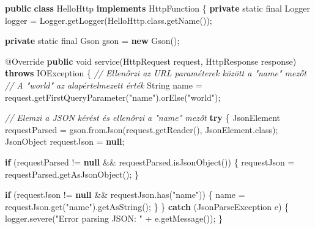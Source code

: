 \documentclass[
]{article}
\newenvironment{Shaded}{}{}
\newcommand{\AttributeTok}[1]{\textcolor[rgb]{0.49,0.56,0.16}{#1}}
\newcommand{\BuiltInTok}[1]{\textcolor[rgb]{0.00,0.50,0.00}{#1}}
\newcommand{\CommentTok}[1]{\textcolor[rgb]{0.38,0.63,0.69}{\textit{#1}}}
\newcommand{\ControlFlowTok}[1]{\textcolor[rgb]{0.00,0.44,0.13}{\textbf{#1}}}
\newcommand{\DataTypeTok}[1]{\textcolor[rgb]{0.56,0.13,0.00}{#1}}
\newcommand{\FunctionTok}[1]{\textcolor[rgb]{0.02,0.16,0.49}{#1}}
\newcommand{\KeywordTok}[1]{\textcolor[rgb]{0.00,0.44,0.13}{\textbf{#1}}}
\newcommand{\NormalTok}[1]{#1}
\newcommand{\OperatorTok}[1]{\textcolor[rgb]{0.40,0.40,0.40}{#1}}
\newcommand{\StringTok}[1]{\textcolor[rgb]{0.25,0.44,0.63}{#1}}
\begin{document}
\begin{Shaded}
\begin{Highlighting}[]
\KeywordTok{public} \KeywordTok{class}\NormalTok{ HelloHttp }\KeywordTok{implements}\NormalTok{ HttpFunction }\OperatorTok{\{}
  \KeywordTok{private} \DataTypeTok{static} \DataTypeTok{final} \BuiltInTok{Logger}\NormalTok{ logger }\OperatorTok{=} \BuiltInTok{Logger}\OperatorTok{.}\FunctionTok{getLogger}\OperatorTok{(}\NormalTok{HelloHttp}\OperatorTok{.}\FunctionTok{class}\OperatorTok{.}\FunctionTok{getName}\OperatorTok{());}

  \KeywordTok{private} \DataTypeTok{static} \DataTypeTok{final}\NormalTok{ Gson gson }\OperatorTok{=} \KeywordTok{new} \FunctionTok{Gson}\OperatorTok{();}

  \AttributeTok{@Override}
  \KeywordTok{public} \DataTypeTok{void} \FunctionTok{service}\OperatorTok{(}\NormalTok{HttpRequest request}\OperatorTok{,}\NormalTok{ HttpResponse response}\OperatorTok{)}
      \KeywordTok{throws} \BuiltInTok{IOException} \OperatorTok{\{}
    \CommentTok{// Ellenőrzi az URL paraméterek között a "name" mezőt}
    \CommentTok{// A "world" az alapértelmezett érték}
    \BuiltInTok{String}\NormalTok{ name }\OperatorTok{=}\NormalTok{ request}\OperatorTok{.}\FunctionTok{getFirstQueryParameter}\OperatorTok{(}\StringTok{"name"}\OperatorTok{).}\FunctionTok{orElse}\OperatorTok{(}\StringTok{"world"}\OperatorTok{);}

    \CommentTok{// Elemzi a JSON kérést és ellenőrzi a "name" mezőt}
    \ControlFlowTok{try} \OperatorTok{\{}
\NormalTok{      JsonElement requestParsed }\OperatorTok{=}\NormalTok{ gson}\OperatorTok{.}\FunctionTok{fromJson}\OperatorTok{(}\NormalTok{request}\OperatorTok{.}\FunctionTok{getReader}\OperatorTok{(),}\NormalTok{ JsonElement}\OperatorTok{.}\FunctionTok{class}\OperatorTok{);}
\NormalTok{      JsonObject requestJson }\OperatorTok{=} \KeywordTok{null}\OperatorTok{;}

      \ControlFlowTok{if} \OperatorTok{(}\NormalTok{requestParsed }\OperatorTok{!=} \KeywordTok{null} \OperatorTok{\&\&}\NormalTok{ requestParsed}\OperatorTok{.}\FunctionTok{isJsonObject}\OperatorTok{())} \OperatorTok{\{}
\NormalTok{        requestJson }\OperatorTok{=}\NormalTok{ requestParsed}\OperatorTok{.}\FunctionTok{getAsJsonObject}\OperatorTok{();}
      \OperatorTok{\}}

      \ControlFlowTok{if} \OperatorTok{(}\NormalTok{requestJson }\OperatorTok{!=} \KeywordTok{null} \OperatorTok{\&\&}\NormalTok{ requestJson}\OperatorTok{.}\FunctionTok{has}\OperatorTok{(}\StringTok{"name"}\OperatorTok{))} \OperatorTok{\{}
\NormalTok{        name }\OperatorTok{=}\NormalTok{ requestJson}\OperatorTok{.}\FunctionTok{get}\OperatorTok{(}\StringTok{"name"}\OperatorTok{).}\FunctionTok{getAsString}\OperatorTok{();}
      \OperatorTok{\}}
    \OperatorTok{\}} \ControlFlowTok{catch} \OperatorTok{(}\NormalTok{JsonParseException e}\OperatorTok{)} \OperatorTok{\{}
\NormalTok{      logger}\OperatorTok{.}\FunctionTok{severe}\OperatorTok{(}\StringTok{"Error parsing JSON: "} \OperatorTok{+}\NormalTok{ e}\OperatorTok{.}\FunctionTok{getMessage}\OperatorTok{());}
    \OperatorTok{\}}


\end{Highlighting}
\end{Shaded}
\end{document}
